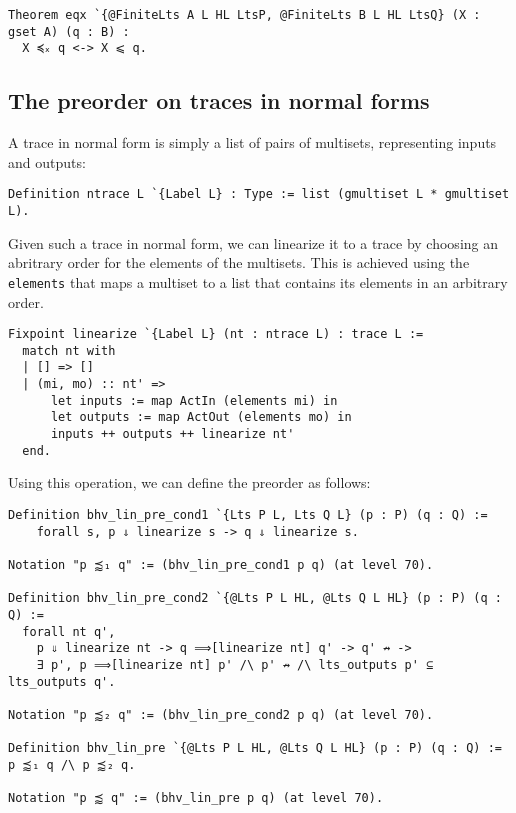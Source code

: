 \begin{mdframed}
  \begin{verbatim}
Theorem eqx `{@FiniteLts A L HL LtsP, @FiniteLts B L HL LtsQ} (X : gset A) (q : B) :
  X ≼ₓ q <-> X ⩽ q.
  \end{verbatim}
\end{mdframed}

\subsection{The preorder on traces in normal forms}

A trace in normal form is simply a list of pairs of multisets, representing
inputs and outputs:

\begin{mdframed}
  \begin{verbatim}
Definition ntrace L `{Label L} : Type := list (gmultiset L * gmultiset L).
  \end{verbatim}
\end{mdframed}

Given such a trace in normal form, we can linearize it to a trace by choosing an
abritrary order for the elements of the multisets. This is achieved using the
\texttt{elements} that maps a multiset to a list that contains its
elements in an arbitrary order.

\begin{mdframed}
  \begin{verbatim}
Fixpoint linearize `{Label L} (nt : ntrace L) : trace L :=
  match nt with
  | [] => []
  | (mi, mo) :: nt' =>
      let inputs := map ActIn (elements mi) in
      let outputs := map ActOut (elements mo) in
      inputs ++ outputs ++ linearize nt'
  end.
  \end{verbatim}
\end{mdframed}

Using this operation, we can define the preorder as follows:

\begin{mdframed}
  \begin{verbatim}
Definition bhv_lin_pre_cond1 `{Lts P L, Lts Q L} (p : P) (q : Q) :=
    forall s, p ⇓ linearize s -> q ⇓ linearize s.

Notation "p ⪷₁ q" := (bhv_lin_pre_cond1 p q) (at level 70).

Definition bhv_lin_pre_cond2 `{@Lts P L HL, @Lts Q L HL} (p : P) (q : Q) :=
  forall nt q',
    p ⇓ linearize nt -> q ⟹[linearize nt] q' -> q' ↛ ->
    ∃ p', p ⟹[linearize nt] p' /\ p' ↛ /\ lts_outputs p' ⊆ lts_outputs q'.

Notation "p ⪷₂ q" := (bhv_lin_pre_cond2 p q) (at level 70).

Definition bhv_lin_pre `{@Lts P L HL, @Lts Q L HL} (p : P) (q : Q) := p ⪷₁ q /\ p ⪷₂ q.

Notation "p ⪷ q" := (bhv_lin_pre p q) (at level 70).
  \end{verbatim}
\end{mdframed}

